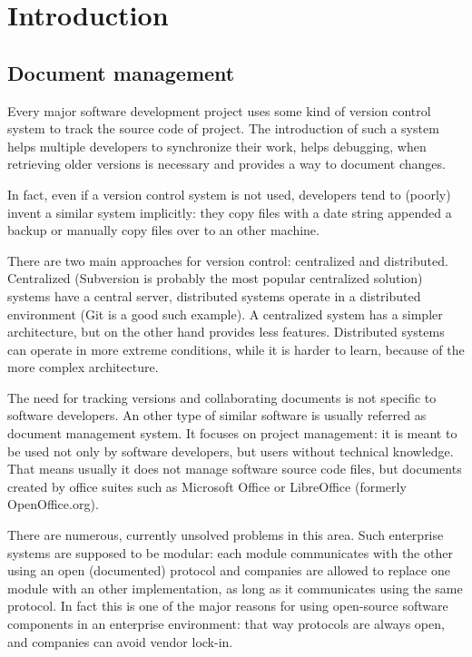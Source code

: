 \chapter{Introduction}

\section{Document management}

Every major software development project uses some kind of version control
system to track the source code of project. The introduction of such a system
helps multiple developers to synchronize their work, helps debugging, when
retrieving older versions is necessary and provides a way to document changes.

In fact, even if a version control system is not used, developers tend to
(poorly) invent a similar system implicitly: they copy files with a date string
appended a backup or manually copy files over to an other machine.

There are two main approaches for version control: centralized and distributed.
Centralized (Subversion\cite{subversion} is probably the most
popular centralized solution) systems have a central server, distributed
systems operate in a distributed environment (Git\cite{git} is a good such
example). A centralized system has a simpler architecture, but on the other
hand provides less features. Distributed systems can operate in more extreme
conditions, while it is harder to learn, because of the more complex
architecture.

The need for tracking versions and collaborating documents is not specific to
software developers. An other type of similar software is usually referred as
document management system. It focuses on project management: it is meant to be
used  not only by software developers, but users without technical knowledge.
That means usually it does not manage software source code files, but documents
created by office suites such as Microsoft Office\cite{mso} or
LibreOffice\cite{lo} (formerly OpenOffice.org\cite{ooo}).

There are numerous, currently unsolved problems in this area. Such enterprise
systems are supposed to be modular: each module communicates with the other
using an open (documented) protocol and companies are allowed to replace one
module with an other implementation, as long as it communicates using the same
protocol. In fact this is one of the major reasons for using open-source
software components in an enterprise environment: that way protocols are always
open, and companies can avoid vendor lock-in.


